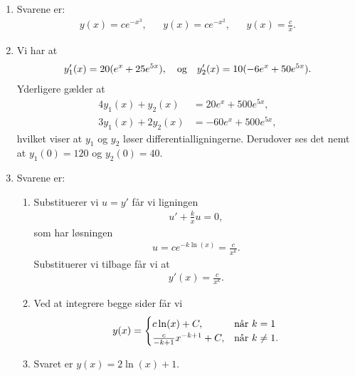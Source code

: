 \begin{enumerate}
	
	\item Svarene er:
	\begin{align*}
	y(x)=ce^{-x^3},&& y(x)=ce^{-x^2},&& y(x)=\frac{c}{x}.
	\end{align*}

	\item Vi har at 
	\begin{align*}
	y_1'(x)=20(e^x+25e^{5x}),\quad \textup{og} \quad y_2'(x)=10(-6e^x+50e^{5x}).
	\end{align*}
	Yderligere gælder at
	\begin{align*}
	4y_1(x)+y_2(x)&=20e^x+500e^{5x},\\
	3y_1(x)+2y_2(x)&=-60e^x+500e^{5x},
	\end{align*}
	hvilket viser at $y_1$ og $y_2$ løser differentialligningerne. Derudover ses det nemt at $y_1(0)=120$ og $y_2(0)=40$.
	
	\item Svarene er:
	
	\begin{enumerate}
		\item Substituerer vi $u=y'$ får vi ligningen
		\begin{align*}
		u'+\frac{k}{x}u=0,
		\end{align*}
		som har løsningen
		\begin{align*}
		u=ce^{-k\ln(x)}=\frac{c}{x^k}.
		\end{align*}
		Substituerer vi tilbage får vi at
		\begin{align}\label{eq:diffeq1ans}
		y'(x)=\frac{c}{x^k}.
		\end{align}

		\item Ved at integrere begge sider får vi
		\begin{align*}
		y(x)=\begin{cases}
		c\ln(x)+C,&\textup{når } k=1\\
		\frac{c}{-k+1}x^{-k+1}+C,&\textup{når } k\neq 1.
		\end{cases}
		\end{align*}
		\item Svaret er $ y(x)= 2\ln(x)+1 $.
		
	\end{enumerate}
	
	
\end{enumerate}